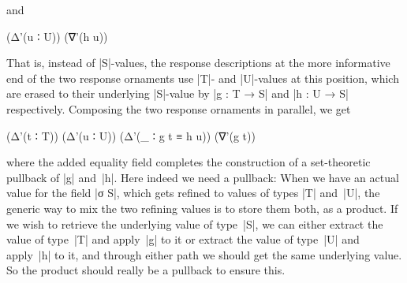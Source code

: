 \begin{itemize}
\begin{code}
\end{code}
and
\restorecolumns
\begin{code}
(Δ'(u ∶ U))  (∇'(h u))
\end{code}
That is, instead of |S|-values, the response descriptions at the more informative end of the two response ornaments use |T|- and |U|-values at this position, which are erased to their underlying |S|-value by |g : T → S| and |h : U → S| respectively.
Composing the two response ornaments in parallel, we get
\begin{code}
(Δ'(t ∶ T)) (Δ'(u ∶ U)) (Δ'(_ ∶ g t ≡ h u)) (∇'(g t))
\end{code}
where the added equality field completes the construction of a set-theoretic pullback of |g| and~|h|.
Here indeed we need a pullback:
When we have an actual value for the field |σ S|, which gets refined to values of types |T| and~|U|, the generic way to mix the two refining values is to store them both, as a product. If we wish to retrieve the underlying value of type~|S|, we can either extract the value of type~|T| and apply~|g| to it or extract the value of type~|U| and apply~|h| to it, and through either path we should get the same underlying value.
So the product should really be a pullback to ensure this.\
\end{itemize}


